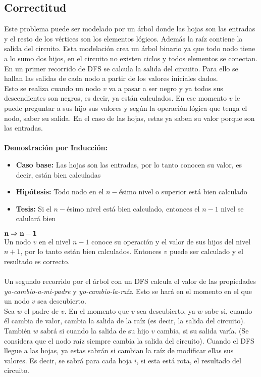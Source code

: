 \documentclass[a4paper,10pt]{article}
\begin{document}
	\subsection{Correctitud}
	Este problema puede ser modelado por un \'arbol donde las hojas son las entradas y el resto de los v\'ertices son los elementos l\'ogicos. Adem\'as la ra\'iz contiene la salida del circuito. Esta modelaci\'on crea un \'arbol binario ya que todo nodo tiene a lo sumo dos hijos, en el circuito no existen ciclos y todos elementos se conectan.
	\\En un primer recorrido de DFS se calcula la salida del circuito. Para ello se hallan las salidas de cada nodo a partir de los valores iniciales dados. 
	\\Esto se realiza cuando un nodo $v$ va a pasar a ser negro y ya todos sus descendientes son negros, es decir, ya est\'an calculados. En ese momento $v$ le puede preguntar a sus hijo sus valores y seg\'un la operaci\'on l\'ogica que tenga el nodo, saber su salida. En el caso de las hojas, estas ya saben su valor porque son las entradas.
	\\\\\textbf{Demostraci\'on por Inducci\'on:} 
	\begin{itemize}
		\item \textbf{Caso base:} Las hojas son las entradas, por lo tanto conocen su valor, es decir, est\'an bien calculadas
		\item \textbf{Hip\'otesis:} Todo nodo en el $n-$\'esimo nivel o superior est\'a bien calculado
		\item \textbf{Tesis:} Si el $n-$\'esimo nivel est\'a bien calculado, entonces el $n-1$ nivel se calular\'a bien
	\end{itemize}
	$\bf{n \Rightarrow n - 1}$
	\\Un nodo $v$ en el nivel $n - 1$ conoce su operaci\'on y el valor de sus hijos del nivel $n + 1$, por lo tanto est\'an bien calculados. Entonces $v$ puede ser calculado y el resultado es correcto.
	\\\\Un segundo recorrido por el \'arbol con un DFS calcula el valor de las propiedades \emph{yo-cambio-a-mi-padre} y \emph{yo-cambio-la-ra\'iz}. Esto se har\'a en el momento en el que un nodo $v$ sea descubierto.
	\\Sea $w$ el padre de $v$. En el momento que $v$ sea descubierto, ya $w$ sabe si, cuando \'el cambia de valor, cambia la salida de la ra\'iz (es decir, la salida del circuito). Tambi\'en $w$ sabr\'a si cuando la salida de su hijo $v$ cambia, si su salida var\'ia. (Se considera que el nodo ra\'iz siempre cambia la salida del circuito). Cuando el DFS llegue a las hojas, ya estas sabr\'an si cambian la ra\'iz de modificar ellas sus valores. Es decir, se sabr\'a para cada hoja $i$, si esta est\'a rota, el resultado del circuito.
\end{document}
